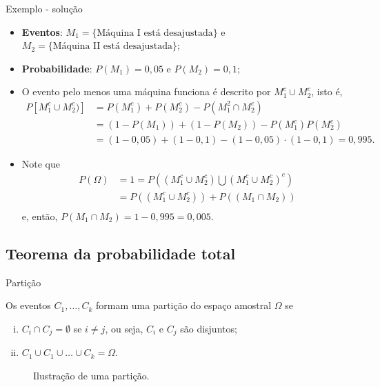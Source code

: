 \documentclass[9pt]{beamer}
\begin{document}
\begin{frame}{Exemplo - solução}
	\begin{itemize}
		\item \textbf{Eventos}: $M_1=\{\mbox{Máquina I está desajustada}\}$ e $M_2=\{\mbox{Máquina II está desajustada}\}$;
		\item \textbf{Probabilidade}: $P(M_1) = 0,05$ e $P(M_2) = 0,1$;
		\item O evento pelo menos uma máquina funciona é descrito por $M_1^c \cup M_2^c$, isto é,
		\begin{align*}
		P[M_1^c \cup M_2^c)] &= P(M_1^c ) + P (M_2^c) - P (M_1^2 \cap M_2^c) \\
		&= (1-P(M_1))  + (1-P(M_2)) - P(M_1^c) P(M_2^c) \\
		&=(1-0,05)  + (1-0,1) - (1-0,05) \cdot (1-0,1) = 0,995.
		\end{align*}
		\item Note que
		\begin{align*}
		P(\Omega) &= 1 =  P\left(\left( M_1^c \cup M_2^c \right)\bigcup \left(M_1^c \cup M_2^c\right)^c\right)\\
		&= P\left(\left( M_1^c \cup M_2^c \right)\right) + P\left(\left( M_1 \cap M_2 \right)\right)\\
		\end{align*}
		e, então, $P(M_1 \cap M_2) = 1 - 0,995 = 0,005$.
	\end{itemize}	
\end{frame}

\subsection{Teorema da probabilidade total}

\begin{frame}{Partição}


		Os eventos $C_1, \dots, C_k$ formam uma partição do espaço amostral $\Omega$ se 
		\begin{enumerate}[i.]
			\item $C_i \cap C_j= \emptyset$ se $i \neq j$, ou seja, $C_i$ e $C_j$ são disjuntos;
			\item $C_1 \cup C_1 \cup \dots \cup C_k  =  \Omega$.
		\end{enumerate}
		
	 \begin{figure}[htbp]
	 \caption{Ilustração de uma partição.}
	 \end{figure}
\end{frame}
\end{document}
